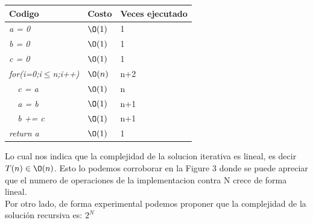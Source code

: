 \documentclass[spanish]{article}
\begin{document}
			\begin{center}
				\begin{table}[H]
					\begin{tabular}{|l|l|l|}
						\hline
						\rowcolor[HTML]{FFCC67} 
						Codigo                           & Costo & Veces ejecutado \\ \hline
						\textit{a = 0}                    & $\O(1)$    & 1               \\ \hline
						\textit{b = 0}                    & $\O(1)$    & 1               \\ \hline
						\textit{c = 0}                    & $\O(1)$    & 1               \\ \hline						
						\textit{for(i=0;i$\leq$n;i++)} & $\O(n)$    & n+2             \\ \hline
						\textit{\  \  c = a}                 & $\O(1)$    & n               \\ \hline
						\textit{\  \  a = b}                     & $\O(1)$    & n+1               \\ \hline
						\textit{\  \  b += c}                     & $\O(1)$    & n+1               \\ \hline
						\textit{return a}                & $\O(1)$    & 1               \\ \hline
					\end{tabular}
				\end{table}										
			\end{center}			
			Lo cual nos indica que la complejidad de la solucion iterativa es lineal, es decir $T(n)\in\O(n)$. Esto lo podemos corroborar en la Figure 3 donde se puede apreciar que el numero de operaciones de la implementacion contra N crece de forma lineal.\\			
			Por otro lado, de forma experimental podemos proponer que la complejidad de la solución recursiva es: $2^N$			
\end{document}
